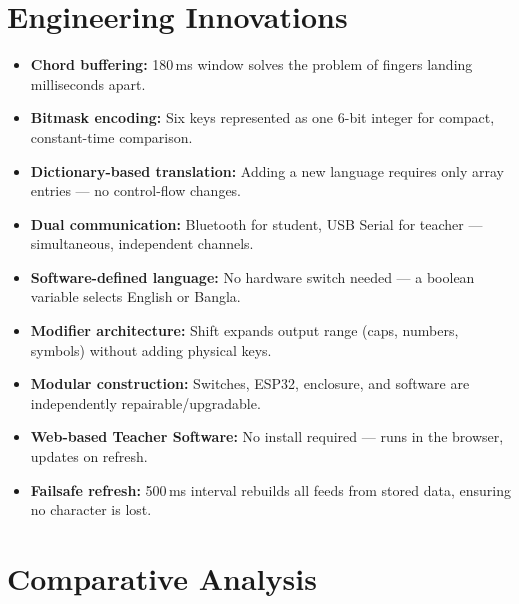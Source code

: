 \documentclass[11pt,a4paper,twoside]{article}
\begin{document}
\section{Engineering Innovations}

\begin{itemize}[nosep]
  \item \textbf{Chord buffering:} 180\,ms window solves the problem of
    fingers landing milliseconds apart.
  \item \textbf{Bitmask encoding:} Six keys represented as one 6-bit integer
    for compact, constant-time comparison.
  \item \textbf{Dictionary-based translation:} Adding a new language requires
    only array entries --- no control-flow changes.
  \item \textbf{Dual communication:} Bluetooth for student, USB Serial for
    teacher --- simultaneous, independent channels.
  \item \textbf{Software-defined language:} No hardware switch needed ---
    a boolean variable selects English or Bangla.
  \item \textbf{Modifier architecture:} Shift expands output range (caps,
    numbers, symbols) without adding physical keys.
  \item \textbf{Modular construction:} Switches, ESP32, enclosure, and
    software are independently repairable/upgradable.
  \item \textbf{Web-based Teacher Software:} No install required --- runs
    in the browser, updates on refresh.
  \item \textbf{Failsafe refresh:} 500\,ms interval rebuilds all feeds
    from stored data, ensuring no character is lost.
\end{itemize}

\section{Comparative Analysis}
\end{document}
